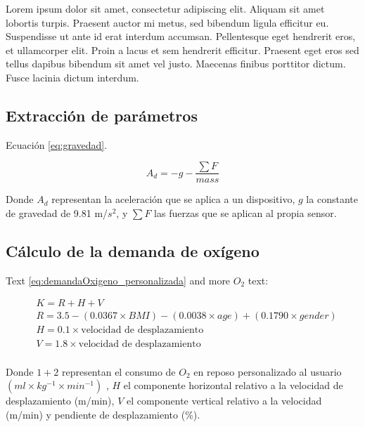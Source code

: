 Lorem ipsum dolor sit amet, consectetur adipiscing elit. Aliquam sit amet lobortis turpis. Praesent auctor mi metus, sed bibendum ligula efficitur eu. Suspendisse ut ante id erat interdum accumsan. Pellentesque eget hendrerit eros, et ullamcorper elit. Proin a lacus et sem hendrerit efficitur. Praesent eget eros sed tellus dapibus bibendum sit amet vel justo. Maecenas finibus porttitor dictum. Fusce lacinia dictum interdum.

\subsection{Extracción de parámetros}
Ecuación \ref{eq:gravedad}. 

\begin{equation} \label{eq:gravedad}
A_{d} = -g - \frac{\sum F}{mass}
\end{equation} 


 


Donde $A_{d}$ representan la aceleración que se aplica a un dispositivo, $g$ la constante de gravedad de 9.81 m/$s^{2}$, y $\sum F$ las fuerzas que se aplican al propia sensor.

\subsection{Cálculo de la demanda de oxígeno} \label{secc:calculoDemandaOxigeno}
Text  \ref{eq:demandaOxigeno_personalizada} and more $O_{2}$ text:

\begin{equation} \label{eq:demandaOxigeno_personalizada}
\begin{split} 
& K = R + H + V \\ 
& R = 3.5 - (0.0367 \times BMI) - (0.0038 \times age) + (0.1790 \times gender)\\
& H = 0.1 \times \textrm{velocidad de desplazamiento}\\ 
& V = 1.8 \times \textrm{velocidad de desplazamiento}\\ 
\end{split} 
\end{equation} 

Donde $1 + 2$ representan el consumo de $O_{2}$ en reposo personalizado al usuario $(ml \times kg^{-1} \times min^{-1})$ \citep{Barstow:1991}, $H$ el componente horizontal relativo a la velocidad de desplazamiento (m/min), $V$ el componente vertical relativo a la velocidad (m/min) y pendiente de desplazamiento (\%).

